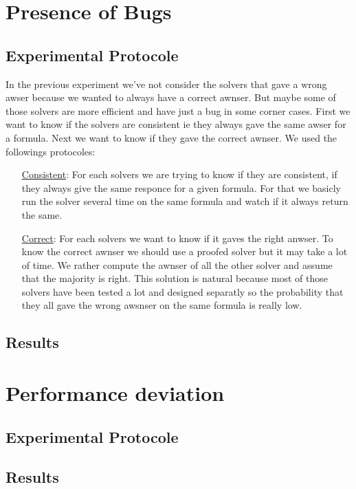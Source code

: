 \documentclass{article}
\begin{document}

\section{Presence of Bugs}
\subsection{Experimental Protocole}
In the previous experiment we've not consider the solvers that gave a wrong awser because we wanted to always have a correct awnser. But maybe some of those solvers are more efficient and have just a bug in some corner cases. First we want to know if the solvers are consistent ie they always gave the same awser for a formula. Next we want to know if they gave the correct awnser.  
We used the followings protocoles:
\begin{itemize}
\item[\underline{Consistent}:]  For each solvers we are trying to know if they are consistent, if they always give the same responce for a given formula. For that we basicly run the solver several time on the same formula and watch if it always return the same. 
\item[\underline{Correct}:] For each solvers we want to know if it gaves the right anwser. To know the correct awnser we should use a proofed solver but it may take a lot of time. We rather compute the awnser of all the other solver and assume that the majority is right. This solution is natural because most of those solvers have been tested a lot and designed separatly so the probability that they all gave the wrong awsnser on the same formula is really low. 
\end{itemize}
\subsection{Results}




\section{Performance deviation}
\subsection{Experimental Protocole}


\subsection{Results}
\end{document}
